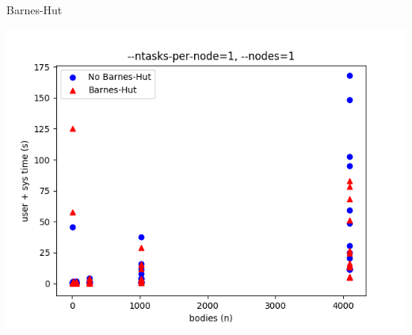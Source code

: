 \documentclass{beamer}
\begin{document}
\begin{frame}[allowframebreaks]{Barnes-Hut}
\framebreak 

\includegraphics[width=\textwidth]{bodies_scaling}
\end{frame}
\end{document}
